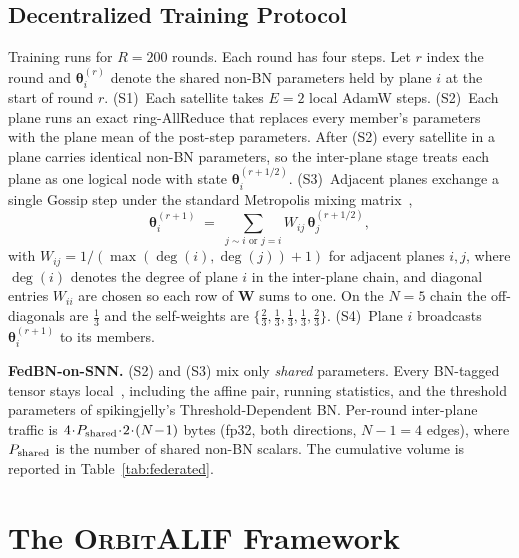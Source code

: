 \documentclass[conference]{IEEEtran}
\newcommand{\OrbitALIF}{\textsc{OrbitALIF}}
\begin{document}
\subsection{Decentralized Training Protocol}\label{sec:sysmodel-procedure}

Training runs for $R\!=\!200$ rounds. Each round has four steps.
Let $r$ index the round and $\boldsymbol{\theta}_i^{(r)}$ denote the
shared non-BN parameters held by plane $i$ at the start of round
$r$. (S1)~Each satellite takes $E\!=\!2$ local AdamW steps.
(S2)~Each plane runs an exact ring-AllReduce that replaces every
member's parameters with the plane mean of the post-step parameters.
After (S2) every satellite in a plane carries identical non-BN
parameters, so the inter-plane stage treats each plane as one
logical node with state $\boldsymbol{\theta}_i^{(r+1/2)}$.
(S3)~Adjacent planes exchange a single Gossip step under the
standard Metropolis mixing matrix~\cite{ref:gossip-boyd},
\begin{equation}
\boldsymbol{\theta}_i^{(r+1)}
\;=\;
\sum_{j \sim i \text{ or } j=i}
W_{ij}\,\boldsymbol{\theta}_j^{(r+1/2)},
\label{eq:gossip}
\end{equation}
with $W_{ij}\!=\!1/(\max(\deg(i),\deg(j))\!+\!1)$ for adjacent
planes $i,j$, where $\deg(i)$ denotes the degree of plane $i$ in
the inter-plane chain, and diagonal entries $W_{ii}$ are chosen so
each row of $\mathbf{W}$ sums to one. On the $N\!=\!5$ chain the
off-diagonals are $\tfrac{1}{3}$ and the self-weights are
$\{\tfrac{2}{3},\tfrac{1}{3},\tfrac{1}{3},\tfrac{1}{3},\tfrac{2}{3}\}$.
(S4)~Plane $i$ broadcasts $\boldsymbol{\theta}_i^{(r+1)}$ to its
members.

\textbf{FedBN-on-SNN.} (S2) and (S3) mix only \emph{shared}
parameters. Every BN-tagged tensor stays local~\cite{ref:fedbn},
including the affine pair, running statistics, and the threshold
parameters of spikingjelly's Threshold-Dependent BN. Per-round
inter-plane traffic is
$4\!\cdot\!P_{\rm shared}\!\cdot\!2\!\cdot\!(N\!-\!1)$ bytes (fp32,
both directions, $N\!-\!1\!=\!4$ edges), where $P_{\rm shared}$ is
the number of shared non-BN scalars. The cumulative volume is
reported in Table~\ref{tab:federated}.

\section{The \OrbitALIF{} Framework}\label{sec:framework}
\end{document}
